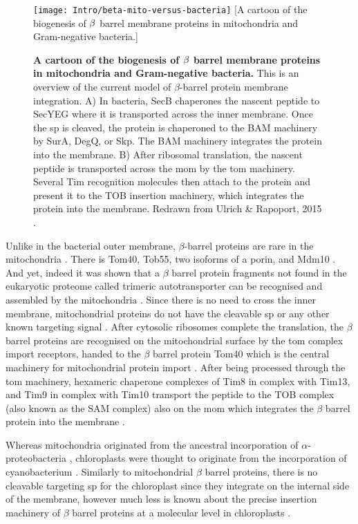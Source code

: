 \begin{figure}[ht]
\centering
\texttt{[image: Intro/beta-mito-versus-bacteria]}
		[A cartoon of the biogenesis of $\protect\beta$ barrel membrane proteins in mitochondria and Gram\--negative bacteria.]{\textbf{A cartoon of the biogenesis of $\protect\beta$ barrel membrane proteins in mitochondria and Gram\--negative bacteria.}
		This is an overview of the current model of $\beta$\--barrel protein membrane integration.
		A) In bacteria, SecB chaperones the nascent peptide to SecYEG where it is transported across the inner membrane.
		Once the \gls{sp} is cleaved, the protein is chaperoned to the BAM machinery by SurA, DegQ, or Skp.
		The BAM machinery integrates the protein into the membrane.
		B) After ribosomal translation, the nascent peptide is transported across the \gls{mom} by the \gls{tom} machinery.
		Several Tim recognition molecules then attach to the protein and present it to the TOB insertion machinery, which integrates the protein into the membrane.
		Redrawn from Ulrich \& Rapoport, 2015 \cite{Ulrich2015}.

		}
\label{fig:beta-mito-versus-bacteria}
\end{figure}

Unlike in the bacterial outer membrane, $\beta$-barrel proteins are rare in the mitochondria \cite{Ulrich2015}.
There is Tom40, Tob55, two isoforms of a porin, and Mdm10 \cite{Ulrich2015}.
And yet, indeed it was shown that a $\beta$ barrel protein fragments not found in the eukaryotic proteome called trimeric autotransporter can be recognised and assembled by the mitochondria \cite{Muller2011}.
Since there is no need to cross the inner membrane, mitochondrial proteins do not have the cleavable \gls{sp} or any other known targeting signal \cite{Ulrich2015}.
After cytosolic ribosomes complete the translation, the $\beta$ barrel proteins are recognised on the mitochondrial surface by the \gls{tom} complex import receptors, handed to the $\beta$ barrel protein Tom40 which is the central machinery for mitochondrial protein import \cite{Chacinska2009}.
After being processed through the \gls{tom} machinery, hexameric chaperone complexes of Tim8 in complex with Tim13, and Tim9 in complex with Tim10 transport the peptide to the TOB complex (also known as the SAM complex) also on the \gls{mom} which integrates the $\beta$ barrel protein into the membrane \cite{Wiedemann2003, Paschen2003, Gentle2004}.

Whereas mitochondria originated from the ancestral incorporation of $\alpha$\--proteobacteria \cite{Gray1999}, chloroplasts were thought to originate from the incorporation of cyanobacterium \cite{McFadden2001}.
Similarly to mitochondrial $\beta$ barrel proteins, there is no cleavable targeting \gls{sp} for the chloroplast since they integrate on the internal side of the membrane, however much less is known about the precise insertion machinery of $\beta$ barrel proteins at a molecular level in chloroplasts \cite{Ulrich2015}.

